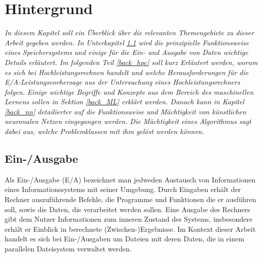 \documentclass[
	12pt,
	a4paper,
	BCOR10mm,
	DIV14,
	listof=totoc,
	bibliography=totoc,
	headsepline
]{scrreprt}
\begin{document}
\chapter{Hintergrund}
\label{Hintergrund}
\textit{
	In diesem Kapitel soll ein Überblick über die relevanten Themengebiete zu dieser Arbeit gegeben werden.
	In Unterkapitel \ref{back_E/A} wird die prinzipielle Funktionsweise eines Speichersystems und einige für die Ein- und Ausgabe von Daten wichtige Details erläutert.
	Im folgenden Teil \ref{back_hpc} soll kurz Erläutert werden, worum es sich bei Hochleistungsrechnen handelt und welche Herausforderungen für die E/A-Leistungsvorhersage aus der Untersuchung eines Hochleistungsrechners folgen.
	Einige wichtige Begriffe und Konzepte aus dem Bereich des maschinellen Lernens sollen in Sektion \ref{back_ML} erklärt werden.
	Danach kann in Kapitel \ref{back_nn} detailierter auf die Funktionsweise und Mächtigkeit von künstlichen neuronalen Netzen eingegangen werden. Die Mächtigkeit eines Algorithmus sagt dabei aus, welche Problemklassen mit ihm gelöst werden können. 
}
\bigskip

\section{Ein-/Ausgabe}
\label{back_E/A}
Als Ein-/Ausgabe (E/A) bezeichnet man jedweden Austausch von Informationen eines Informationssystems mit seiner Umgebung. Durch Eingaben erhält der Rechner auszuführende Befehle, die Programme und Funktionen die er ausführen soll, sowie die Daten, die verarbeitet werden sollen.
Eine Ausgabe des Rechners gibt dem Nutzer Informationen zum inneren Zustand des Systems, insbesondere erhält er Einblick in berechnete (Zwischen-)Ergebnisse.  
Im Kontext dieser Arbeit handelt es sich bei Ein-/Ausgaben um Dateien mit deren Daten, die in einem parallelen Dateisystem verwaltet werden.
\medskip
\end{document}
